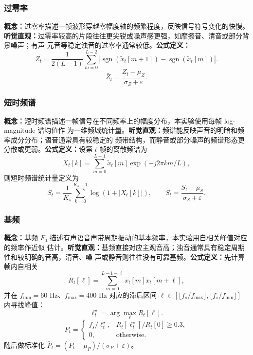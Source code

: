 \documentclass[a4paper]{article}
\begin{document}
\subsubsection{过零率}

\textbf{概念：}过零率描述一帧波形穿越零幅度轴的频繁程度，反映信号符号变化的快慢。
\textbf{听觉直观：}过零率较高的片段往往更尖锐或噪声感更强，如摩擦音、清音或部分背景噪声；有声
元音等稳定浊音的过零率通常较低。\textbf{公式定义：}
\begin{equation}
  Z_t = \frac{1}{2(L-1)} \sum_{m=0}^{L-2}
  \left|\operatorname{sgn}(\tilde{x}_t[m+1])-\operatorname{sgn}(\tilde{x}_t[m])\right|.
\end{equation}
\begin{equation}
  \bar{Z}_t = \frac{Z_t-\mu_Z}{\sigma_Z+\varepsilon}.
\end{equation}

\subsubsection{短时频谱}

\textbf{概念：}短时频谱描述一帧信号在不同频率上的幅度分布，本实验使用每帧 log-magnitude 谱均值作
为一维频域统计量。\textbf{听觉直观：}频谱能反映声音的明暗和频率成分分布；语音通常具有较稳定的
频带结构，而静音或部分噪声的频谱形态更分散或更弱。\textbf{公式定义：}设第 $t$ 帧的离散频谱为
\begin{equation}
  X_t[k]=\sum_{m=0}^{L-1}\tilde{x}_t[m]\exp\left(-j2\pi km/L\right),
\end{equation}
则短时频谱统计量定义为
\begin{equation}
  S_t = \frac{1}{K_s}\sum_{k=0}^{K_s-1}\log\left(1+|X_t[k]|\right),
  \qquad
  \bar{S}_t = \frac{S_t-\mu_S}{\sigma_S+\varepsilon}.
\end{equation}

\subsubsection{基频}

\textbf{概念：}基频 $F_0$ 描述有声语音声带周期振动的基本频率，本实验用自相关峰值对应的频率作近似
估计。\textbf{听觉直观：}基频直接对应主观音高；浊音通常具有稳定周期性和较明确的音高，清音、噪
声或静音则往往没有可靠基频。\textbf{公式定义：}先计算帧内自相关
\begin{equation}
  R_t[\ell]=\sum_{m=0}^{L-1-\ell}\tilde{x}_t[m]\tilde{x}_t[m+\ell],
\end{equation}
并在 $f_{\min}=60$ Hz、$f_{\max}=400$ Hz 对应的滞后区间
$\ell\in[\lfloor f_s/f_{\max}\rfloor,\lfloor f_s/f_{\min}\rfloor]$ 内寻找峰值：
\begin{equation}
  \ell_t^\star=\arg\max_{\ell} R_t[\ell].
\end{equation}
\begin{equation}
  P_t=
  \begin{cases}
    f_s/\ell_t^\star, & R_t[\ell_t^\star]/R_t[0]\ge 0.3,\\
    0, & \text{otherwise}.
  \end{cases}
\end{equation}
随后做标准化 $\bar{P}_t=(P_t-\mu_P)/(\sigma_P+\varepsilon)$。
\end{document}
